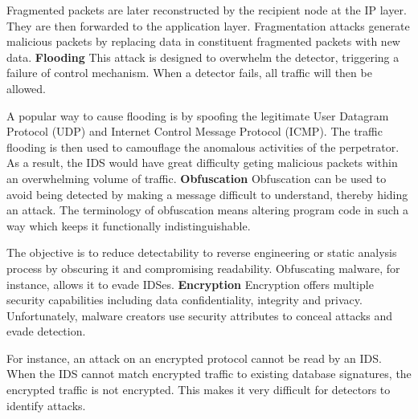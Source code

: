 Fragmented packets are later reconstructed by the recipient node at the IP layer. They are then forwarded to the application layer. Fragmentation attacks generate malicious packets by replacing data in constituent fragmented packets with new data.
\textbf{Flooding}
This attack is designed to overwhelm the detector, triggering a failure of control mechanism. When a detector fails, all traffic will then be allowed.

A popular way to cause flooding is by spoofing the legitimate User Datagram Protocol (UDP) and Internet Control Message Protocol (ICMP). The traffic flooding is then used to camouflage the anomalous activities of the perpetrator. As a result, the IDS would have great difficulty geting malicious packets within an overwhelming volume of traffic.
\textbf{Obfuscation}
Obfuscation can be used to avoid being detected by making a message difficult to understand, thereby hiding an attack. The terminology of obfuscation means altering program code in such a way which keeps it functionally indistinguishable.

The objective is to reduce detectability to reverse engineering or static analysis process by obscuring it and compromising readability. Obfuscating malware, for instance, allows it to evade IDSes.
\textbf{Encryption}
Encryption offers multiple security capabilities including data confidentiality, integrity and privacy. Unfortunately, malware creators use security attributes to conceal attacks and evade detection.

For instance, an attack on an encrypted protocol cannot be read by an IDS. When the IDS cannot match encrypted traffic to existing database signatures, the encrypted traffic is not encrypted. This makes it very difficult for detectors to identify attacks.














































